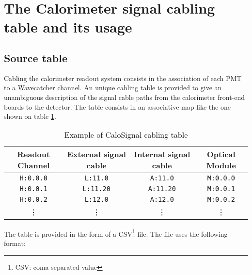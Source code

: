 
\clearpage
\section{The Calorimeter signal cabling table and its usage}

\subsection{Source table}

Cabling the calorimeter readout system  consists in the association of
each  PMT  to a  Wavecatcher  channel.   An  unique cabling  table  is
provided to give an unambiguous  description of the signal cable paths
from  the calorimeter  front-end boards  to the  detector.  The  table
consists  in  an   associative  map  like  the  one   shown  on  table
\ref{tab:calosignal:map:1}.

\begin{table}[h]
\begin{center}
\begin{tabular}{|c|c|c|c|}
  \hline
  \textbf{Readout Channel}& \textbf{External signal cable} & \textbf{Internal signal cable} & \textbf{Optical Module} \\
  \hline
  \hline
  \texttt{H:0.0.0}   & \texttt{L:11.0}   & \texttt{A:11.0}   & \texttt{M:0.0.0}   \\
  \hline
  \texttt{H:0.0.1}   & \texttt{L:11.20}  & \texttt{A:11.20}  & \texttt{M:0.0.1}   \\
  \hline
  \texttt{H:0.0.2}   & \texttt{L:12.0}   & \texttt{A:12.0}   & \texttt{M:0.0.2}   \\
  \hline
  \vdots             & \vdots            &  \vdots           & \vdots             \\  
  \hline
\end{tabular}
\end{center}
\caption{Example of CaloSignal cabling table}
\label{tab:calosignal:map:1}
\end{table}

\par\noindent The table is provided in the form of a CSV\footnote{CSV:
  coma separated value} file.  The file uses the following format:

